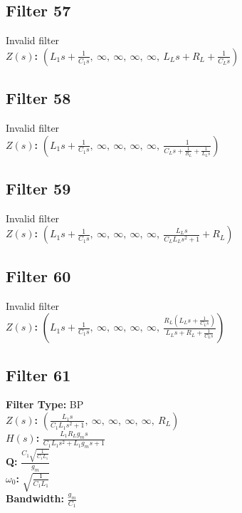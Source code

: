 \documentclass{article}
\begin{document}
\subsection*{Filter 57}
Invalid filter \\ 
\textbf{$Z(s)$:} $\left( L_{1} s + \frac{1}{C_{1} s}, \  \infty, \  \infty, \  \infty, \  \infty, \  L_{L} s + R_{L} + \frac{1}{C_{L} s}\right)$ \\ 
\subsection*{Filter 58}
Invalid filter \\ 
\textbf{$Z(s)$:} $\left( L_{1} s + \frac{1}{C_{1} s}, \  \infty, \  \infty, \  \infty, \  \infty, \  \frac{1}{C_{L} s + \frac{1}{R_{L}} + \frac{1}{L_{L} s}}\right)$ \\ 
\subsection*{Filter 59}
Invalid filter \\ 
\textbf{$Z(s)$:} $\left( L_{1} s + \frac{1}{C_{1} s}, \  \infty, \  \infty, \  \infty, \  \infty, \  \frac{L_{L} s}{C_{L} L_{L} s^{2} + 1} + R_{L}\right)$ \\ 
\subsection*{Filter 60}
Invalid filter \\ 
\textbf{$Z(s)$:} $\left( L_{1} s + \frac{1}{C_{1} s}, \  \infty, \  \infty, \  \infty, \  \infty, \  \frac{R_{L} \left(L_{L} s + \frac{1}{C_{L} s}\right)}{L_{L} s + R_{L} + \frac{1}{C_{L} s}}\right)$ \\ 
\subsection*{Filter 61}
\textbf{Filter Type:} BP \\ 
\textbf{$Z(s)$:} $\left( \frac{L_{1} s}{C_{1} L_{1} s^{2} + 1}, \  \infty, \  \infty, \  \infty, \  \infty, \  R_{L}\right)$ \\ 
\textbf{$H(s)$:} $\frac{L_{1} R_{L} g_{m} s}{C_{1} L_{1} s^{2} + L_{1} g_{m} s + 1}$ \\ 
\textbf{Q:} $\frac{C_{1} \sqrt{\frac{1}{C_{1} L_{1}}}}{g_{m}}$ \\ 
\textbf{$\omega_0$:} $\sqrt{\frac{1}{C_{1} L_{1}}}$ \\ 
\textbf{Bandwidth:} $\frac{g_{m}}{C_{1}}$ \\ 
\end{document}
